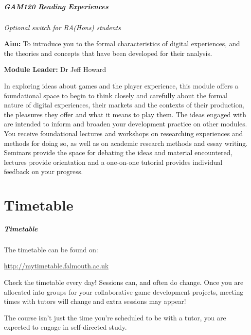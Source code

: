 \begin{frame}
	\frametitle{GAM120 Reading Experiences}
		
	\textit{Optional switch for BA(Hons)	 students}
		
		\vspace{0.2em}
		
	\small{\textbf{Aim:} To introduce you to the formal characteristics of digital experiences, and the theories and concepts that have been developed for their analysis.}
	
	\vspace{0.5em}
	
	\small{\textbf{Module Leader:} Dr Jeff Howard}
	
	\vspace{0.5em}
	
\footnotesize{In exploring ideas about games and the player experience, this module offers a foundational space to begin to think closely and carefully about the formal nature of digital experiences, their markets and the contexts of their production, the pleasures they offer and what it means to play them. The ideas engaged with are intended to inform and broaden your development practice on other modules. You receive foundational lectures and workshops on researching experiences and methods for doing so, as well as on academic research methods and essay writing. Seminars provide the space for debating the ideas and material encountered, lectures provide orientation and a one-on-one tutorial provides individual feedback on your progress.}
	
\end{frame}

\part{Timetable}
\frame{\partpage}

\begin{frame}
	\frametitle{Timetable}
	
	The timetable can be found on:
	
	\vspace{0.5em}
	
	\indent \url{http://mytimetable.falmouth.ac.uk}
	
	\vspace{0.5em}
	
	Check the timetable every day! Sessions can, and often do change. Once you are allocated into groups for your collaborative game development projects, meeting times with tutors will change and extra sessions may appear!
	
	\vspace{0.5em}
	
	 The course isn't just the time you're scheduled to be with a tutor, you are expected to engage in self-directed study.
	
\end{frame}

